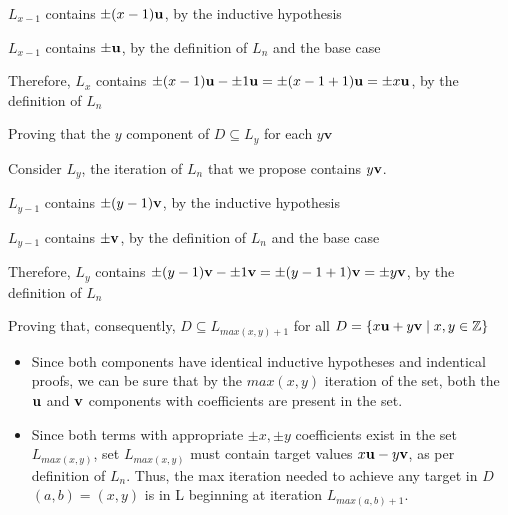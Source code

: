 \documentclass[11pt]{article}
\begin{document}
\begin{solution}[1]
\begin{itemize}
\begin{center}
$L_{x-1}$ contains $\pm (x-1){\bf u}$, by the inductive hypothesis
\item $L_{x-1}$ contains $\pm{\bf u}$, by the definition of $L_n$ and the base case
\item Therefore, $L_x$ contains $\pm (x-1){\bf u} - \pm 1{\bf u} = \pm (x-1+1){\bf u} = \pm x{\bf u}$, by the definition of $L_n$
\end{center}
\end{itemize}
\item Proving that the $y$ component of $D \subseteq L_y$ for each $y\textbf{v}$
\begin{itemize}
\item Consider $L_y$, the iteration of $L_n$ that we propose contains $y{\bf v}$. 
\begin{center} 
$L_{y-1}$ contains $\pm (y-1){\bf v}$, by the inductive hypothesis
\item $L_{y-1}$ contains $\pm{\bf v}$, by the definition of $L_n$ and the base case
\item Therefore, $L_y$ contains $\pm (y-1){\bf v} - \pm 1{\bf v} = \pm (y-1+1){\bf v} = \pm y{\bf v}$, by the definition of $L_n$
\end{center}
\end{itemize}
\item Proving that, consequently, $D \subseteq L_{max(x,y) + 1}$ for all $D = \{ x{\bf u}+y{\bf
  v} \mid x,y \in \Z \}$ 
\begin{itemize}
\item Since both components have identical inductive hypotheses and indentical proofs, we can be sure that by the $max(x,y)$ iteration of the set, both the ${\bf u}$ and ${ \bf v}$ components with coefficients are present in the set. 
\item Since both terms with appropriate $\pm x, \pm y$ coefficients exist in the set $L_{max(x,y)}$, set $L_{max(x,y)}$ must contain target values $x{\bf u} - y{\bf v}$, as per definition of $L_n$. Thus, the max iteration needed to achieve any target in $D$ $(a,b) = (x,y)$ is in L beginning at iteration $L_{max(a,b) + 1}$. 
\end{itemize}
\end{solution}
\end{document}
